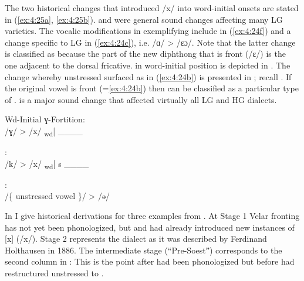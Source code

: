 \begin{sloppypar}
The two historical changes that introduced /x/ into word-initial onsets are stated in (\ref{ex:4:25a}, \ref{ex:4:25b}).  and  were general sound changes affecting many LG varieties. The vocalic modifications in  exemplifying  include  in (\ref{ex:4:24f}) and a change specific to LG in (\ref{ex:4:24c}), i.e. /ɑ/ > /ɛɔ/. Note that the latter change is classified as  because the part of the new diphthong that is front (/ɛ/) is the one adjacent to the dorsal fricative.  in word-initial position is depicted in . The change whereby unstressed  surfaced as  in (\ref{ex:4:24b}) is presented in ; recall . If the original vowel is front (=\ref{ex:4:24b}) then  can be classified as a particular type of .  is a major sound change that affected virtually all LG and HG dialects.
\end{sloppypar}

\ea%
    \label{ex:4:25}
\ea Wd-Initial ɣ-Fortition:\\\label{ex:4:25a}
    /ɣ/ > /x/ \textsubscript{wd}[ \_\_\_\_ 

\ex {}:\\\label{ex:4:25b}
    /k/ > /x/ \textsubscript{wd}[ s \_\_\_\_
 
\ex {}:\\\label{ex:4:25c}
/\{ unstressed vowel \}/ >  /ə/
\z 
\z 

In  I give historical derivations for three examples from . At Stage 1 Velar fronting has not yet been phonologized, but  and  had already introduced new instances of [x] (/x/). Stage 2 represents the dialect as it was described by Ferdinand Holthausen in 1886. The intermediate stage (“Pre-Soestˮ) corresponds to the second column in : This is the point after  had been phonologized but before  had restructured unstressed  to .

